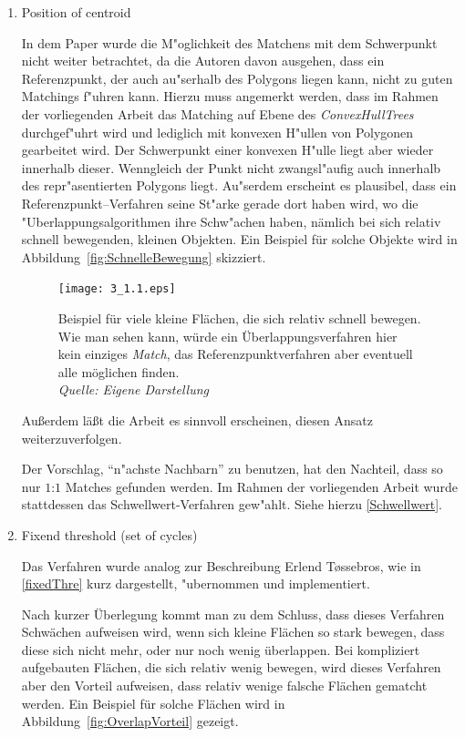\begin{enumerate}
\item Position of centroid

In dem Paper wurde die M"oglichkeit des Matchens mit dem Schwerpunkt nicht weiter betrachtet, da die Autoren davon ausgehen, dass ein Referenzpunkt, der auch au"serhalb des Polygons liegen kann, nicht zu guten Matchings f"uhren kann. Hierzu muss angemerkt werden, dass im Rahmen der vorliegenden Arbeit das Matching auf Ebene des \textit{ConvexHullTrees} durchgef"uhrt wird und lediglich mit konvexen H"ullen von Polygonen gearbeitet wird. Der Schwerpunkt einer konvexen H"ulle liegt aber wieder innerhalb dieser. Wenngleich der Punkt nicht zwangsl"aufig auch innerhalb des repr"asentierten Polygons liegt. Au"serdem erscheint es plausibel, dass ein Referenzpunkt--Verfahren seine St"arke gerade dort haben wird, wo die "Uberlappungsalgorithmen ihre Schw"achen haben, nämlich bei sich relativ schnell bewegenden, kleinen Objekten. Ein Beispiel für solche Objekte wird in Abbildung~\vref{fig:SchnelleBewegung} skizziert.

\begin{figure}
	\centering
	\texttt{[image: 3\_1.1.eps]}
	\caption[Beispiel für den Vorteil von Referenzpunktverfahren]{Beispiel für viele kleine Flächen, die sich relativ schnell bewegen. Wie man sehen kann, würde ein Überlappungsverfahren hier kein einziges \textit{Match}, das Referenzpunktverfahren aber eventuell alle möglichen finden.\\\textit{Quelle: Eigene Darstellung}}
	\label{fig:SchnelleBewegung}
\end{figure}


Außerdem läßt die Arbeit \cite{AFRW} es sinnvoll erscheinen, diesen Ansatz weiterzuverfolgen.

Der Vorschlag, "`n"achste Nachbarn"' zu benutzen, hat den Nachteil, dass so nur $1$:$1$ Matches gefunden werden. Im Rahmen der vorliegenden Arbeit wurde stattdessen das Schwellwert-Verfahren gew"ahlt. Siehe hierzu \vref{Schwellwert}.

\item Fixend threshold (set of cycles)

Das Verfahren wurde analog zur Beschreibung Erlend T\o{}ssebros, wie in \vref{fixedThre} kurz dargestellt, "ubernommen und implementiert. 

Nach kurzer Überlegung kommt man zu dem Schluss, dass dieses Verfahren Schwächen aufweisen wird, wenn sich kleine Flächen so stark bewegen, dass diese sich nicht mehr, oder nur noch wenig überlappen. Bei kompliziert aufgebauten Flächen, die sich relativ wenig bewegen, wird dieses Verfahren aber den Vorteil aufweisen, dass relativ wenige falsche Flächen gematcht werden. Ein Beispiel für solche Flächen wird in Abbildung~\vref{fig:OverlapVorteil} gezeigt.


\end{enumerate}
